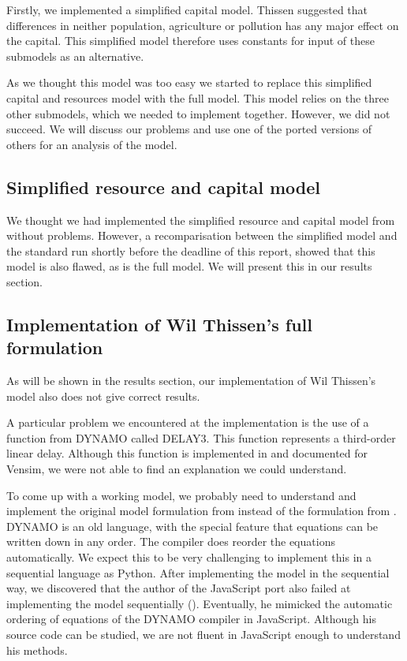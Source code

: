 \documentclass[10pt,a4paper]{scrartcl}
\begin{document}
Firstly, we implemented a simplified capital model. Thissen suggested that differences in neither population, agriculture or pollution has any major effect on the capital. This simplified model therefore uses constants for input of these submodels as an alternative.

As we thought this model was too easy we started to replace this simplified capital and resources model with the full model. This model relies on the three other submodels, which we needed to implement together. However, we did not succeed. We will discuss our problems and use one of the ported versions of others for an analysis of the model.

\subsection*{Simplified resource and capital model}

We thought we had implemented the simplified resource and capital model from \cite{thissen1978investigations} without problems. However, a recomparisation between the simplified model and the standard run shortly before the deadline of this report, showed that this model is also flawed, as is the full model. We will present this in our results section.

\subsection*{Implementation of Wil Thissen's full formulation}

As will be shown in the results section, our implementation of Wil Thissen's model also does not give correct results.

A particular problem we encountered at the implementation is the use of a function from DYNAMO called DELAY3. This function represents a third-order linear delay. Although this function is implemented in and documented for Vensim, we were not able to find an explanation we could understand.

To come up with a working model, we probably need to understand and implement the original model formulation from \cite{forresterworld} instead of the formulation from \cite{thissen1978investigations}. DYNAMO is an old language, with the special feature that equations can be written down in any order. The compiler does reorder the equations automatically. We expect this to be very challenging to implement this in a sequential language as Python.  After implementing the model in the sequential way, we discovered that the author of the JavaScript port also failed at implementing the model sequentially (\cite{blogpost}). Eventually, he mimicked the automatic ordering of equations of the DYNAMO compiler in JavaScript. Although his source code can be studied, we are not fluent in JavaScript enough to understand his methods.
\end{document}
